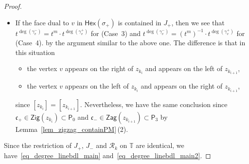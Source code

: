 \documentclass[10pt,a4paper]{amsart}
\numberwithin{equation}{section}
\theoremstyle{definition}
\newcommand{\TT}{\mathbb{T}}
\newcommand{\calR}{\mathcal{R}}
\newcommand{\fkc}{\mathfrak{c}}
\newcommand{\sfP}{\mathsf{P}}
\newcommand{\Zig}{\mathsf{Zig}}
\newcommand{\Zag}{\mathsf{Zag}}
\newcommand{\Hex}{\mathsf{Hex}}
\begin{document}
\begin{proof}
\begin{itemize}
\item If the face dual to $v$ in $\Hex(\sigma_+)$ is contained in $J_+$, then
we see that
$t^{\deg(\gamma^-_v)}=t^m\cdot t^{\deg(\gamma^+_v)}$ for (Case~3) and $t^{\deg(\gamma^-_v)}=(t^m)^{-1}\cdot t^{\deg(\gamma^+_v)}$ for (Case~4).
by the argument similar to the above one. The difference is that in this situation
\begin{itemize}\setlength{\leftskip}{1cm}\itemsep=0pt
\item[(Case 3)] the vertex $v$ appears on the right of $z_{k_i}$ and appears on the left of $z_{k_{i+1}}$,
\item[(Case 4)] the vertex $v$ appears on the left of $z_{k_i}$ and appears on the right of $z_{k_{i+1}}$,
\end{itemize}
since $[z_{k_i}]=[z_{k_{i+1}}]$.
Nevertheless, we have the same conclusion since $\fkc_+\in\Zig(z_{k_i})\subset\sfP_0$ and $\fkc_-\in\Zag(z_{k_{i+1}})\subset\sfP_3$
by Lemma~\ref{lem_zigzag_containPM}\,(2).
\end{itemize}
Since the restriction of $J_+$, $J_-$ and $\calR_k$ on $\TT$ are identical,
we have~\eqref{eq_degree_linebdl_main} and~\eqref{eq_degree_linebdl_main2}.


\end{proof}
\end{document}
